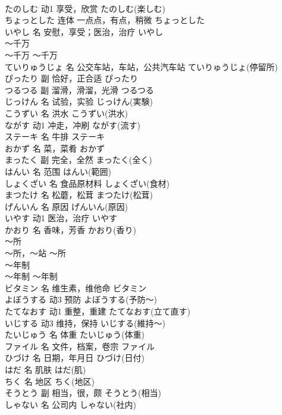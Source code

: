 \documentclass[8pt]{extreport}
\begin{document}
\begin{CJK}{UTF8}{min}
\\	たのしむ	动1	享受，欣赏	たのしむ(楽しむ)	
\\	ちょっとした	连体	一点点，有点，稍微	ちょっとした	
\\	いやし	名	安慰，享受；医治，治疗	いやし	
\\	～千万	
\\	～千万	～千万	
\\	ていりゅうじょ	名	公交车站，车站，公共汽车站	ていりゅうじょ(停留所)	
\\	ぴったり	副	恰好，正合适	ぴったり	
\\	つるつる	副	溜滑，滑溜，光滑	つるつる	
\\	じっけん	名	试验，实验	じっけん(実験)	
\\	こうずい	名	洪水	こうずい(洪水)	
\\	ながす	动1	冲走，冲刷	ながす(流す)	
\\	ステーキ	名	牛排	ステーキ	
\\	おかず	名	菜，菜肴	おかず	
\\	まったく	副	完全，全然	まったく(全く)	
\\	はんい	名	范围	はんい(範囲)	
\\	しょくざい	名	食品原材料	しょくざい(食材)	
\\	まつたけ	名	松蘑，松茸	まつたけ(松茸)	
\\	げんいん	名	原因	げんいん(原因)	
\\	いやす	动1	医治，治疗	いやす	
\\	かおり	名	香味，芳香	かおり(香り)	
\\	～所	
\\	～所，～站	～所	
\\	～年制	
\\	～年制	～年制	
\\	ビタミン	名	维生素，维他命	ビタミン	
\\	よぼうする	动3	预防	よぼうする(予防～)	
\\	たてなおす	动1	重整，重建	たてなおす(立て直す)	
\\	いじする	动3	维持，保持	いじする(維持～)	
\\	たいじゅう	名	体重	たいじゅう(体重)	
\\	ファイル	名	文件，档案，卷宗	ファイル	
\\	ひづけ	名	日期，年月日	ひづけ(日付)	
\\	はだ	名	肌肤	はだ(肌)	
\\	ちく	名	地区	ちく(地区)	
\\	そうとう	副	相当，很，颇	そうとう(相当)	
\\	しゃない	名	公司内	しゃない(社内)	

\end{CJK}
\end{document}
